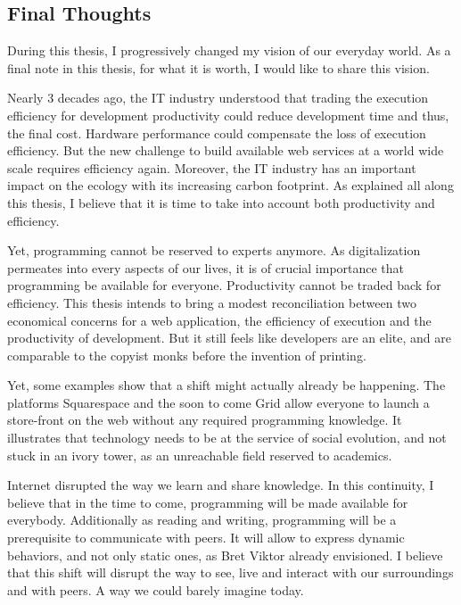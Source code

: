 

\subsection{Final Thoughts}

During this thesis, I progressively changed my vision of our everyday world.
As a final note in this thesis, for what it is worth, I would like to share this vision.

Nearly 3 decades ago, the IT industry understood that trading the execution efficiency for development productivity could reduce development time and thus, the final cost.
Hardware performance could compensate the loss of execution efficiency.
But the new challenge to build available web services at a world wide scale requires efficiency again.
Moreover, the IT industry has an important impact on the ecology with its increasing carbon footprint.
As explained all along this thesis, I believe that it is time to take into account both productivity and efficiency.

Yet, programming cannot be reserved to experts anymore.
As digitalization permeates into every aspects of our lives, it is of crucial importance that programming be available for everyone.
Productivity cannot be traded back for efficiency.
This thesis intends to bring a modest reconciliation between two economical concerns for a web application, the efficiency of execution and the productivity of development.
But it still feels like developers are an elite, and are comparable to the copyist monks before the invention of printing.

Yet, some examples show that a shift might actually already be happening.
The platforms Squarespace and the soon to come Grid allow everyone to launch a store-front on the web without any required programming knowledge.
It illustrates that technology needs to be at the service of social evolution, and not stuck in an ivory tower, as an unreachable field reserved to academics.

Internet disrupted the way we learn and share knowledge.
In this continuity, I believe that in the time to come, programming will be made available for  everybody.
Additionally as reading and writing, programming will be a prerequisite to communicate with peers.
It will allow to express dynamic behaviors, and not only static ones, as Bret Viktor already envisioned.
I believe that this shift will disrupt the way to see, live and interact with our surroundings and with peers.
A way we could barely imagine today.

